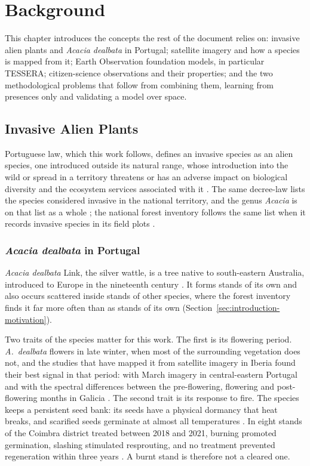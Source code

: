 \chapter{Background}
\label{sec:background}

This chapter introduces the concepts the rest of the document relies
on: invasive alien plants and \emph{Acacia dealbata} in Portugal;
satellite imagery and how a species is mapped from it; Earth
Observation foundation models, in particular TESSERA; citizen-science
observations and their properties; and the two methodological
problems that follow from combining them, learning from presences
only and validating a model over space.

\section{Invasive Alien Plants}
\label{sec:background-iap}

Portuguese law, which this work follows, defines an invasive species
as an alien species, one introduced outside its natural range, whose
introduction into the wild or spread in a territory threatens or has
an adverse impact on biological diversity and the ecosystem services
associated with it \cite{dl92-2019}. The same decree-law lists the
species considered invasive in the national territory, and the genus
\emph{Acacia} is on that list as a whole \cite{dl92-2019}; the
national forest inventory follows the same list when it records
invasive species in its field plots \cite{icnf2019}.

\subsection{\emph{Acacia dealbata} in Portugal}
\label{sec:background-iap-acacia}

\emph{Acacia dealbata} Link, the silver wattle, is a tree native to
south-eastern Australia, introduced to Europe in the nineteenth century
\cite{dessi2021}. It forms stands of its own and also occurs
scattered inside stands of other species, where the forest inventory
finds it far more often than as stands of its own
(Section~\ref{sec:introduction-motivation}).

Two traits of the species matter for this work. The first is its
flowering period. \emph{A.~dealbata} flowers in late winter, when most
of the surrounding vegetation does not, and the studies that have
mapped it from satellite imagery in Iberia found their best signal in
that period: with March imagery in central-eastern Portugal
\cite{martins2016} and with the spectral differences between the
pre-flowering, flowering and post-flowering months in Galicia
\cite{domingo2023}. The second trait is its response to fire. The
species keeps a persistent seed bank: its seeds have a physical
dormancy that heat breaks, and scarified seeds germinate at almost all
temperatures \cite{dessi2021}. In eight stands of the Coimbra district
treated between 2018 and 2021, burning promoted germination, slashing
stimulated resprouting, and no treatment prevented regeneration within
three years \cite{riveiro2025}. A burnt stand is therefore not a
cleared one.

